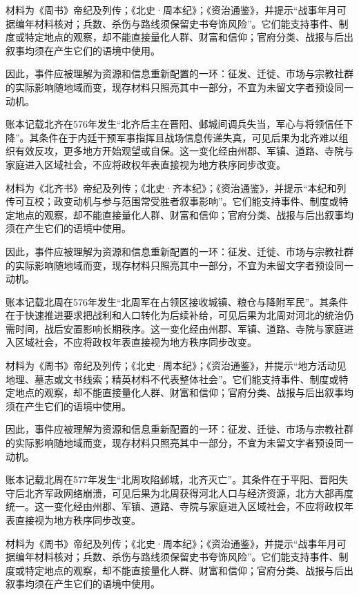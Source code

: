 材料为《周书》帝纪及列传；《北史·周本纪》；《资治通鉴》，并提示“战事年月可据编年材料核对；兵数、杀伤与路线须保留史书夸饰风险”。它们能支持事件、制度或特定地点的观察，却不能直接量化人群、财富和信仰；官府分类、战报与后出叙事均须在产生它们的语境中使用。

因此，事件应被理解为资源和信息重新配置的一环：征发、迁徙、市场与宗教社群的实际影响随地域而变，现存材料只照亮其中一部分，不宜为未留文字者预设同一动机。

账本记载北齐在576年发生“北齐后主在晋阳、邺城间调兵失当，军心与将领信任下降”。其条件在于内廷干预军事指挥且战场信息传递失真，可见后果为北齐难以组织有效反攻，更多地方开始观望或自保。这一变化经由州郡、军镇、道路、寺院与家庭进入区域社会，不应将政权年表直接视为地方秩序同步改变。

材料为《北齐书》帝纪及列传；《北史·齐本纪》；《资治通鉴》，并提示“本纪和列传可互校；政变动机与参与范围常受胜者叙事影响”。它们能支持事件、制度或特定地点的观察，却不能直接量化人群、财富和信仰；官府分类、战报与后出叙事均须在产生它们的语境中使用。

因此，事件应被理解为资源和信息重新配置的一环：征发、迁徙、市场与宗教社群的实际影响随地域而变，现存材料只照亮其中一部分，不宜为未留文字者预设同一动机。

账本记载北周在576年发生“北周军在占领区接收城镇、粮仓与降附军民”。其条件在于快速推进要求把战利和人口转化为后续补给，可见后果为北周对河北的统治仍需时间，战后安置影响长期秩序。这一变化经由州郡、军镇、道路、寺院与家庭进入区域社会，不应将政权年表直接视为地方秩序同步改变。

材料为《周书》帝纪及列传；《北史·周本纪》；《资治通鉴》，并提示“地方活动见地理、墓志或文书线索；精英材料不代表整体社会”。它们能支持事件、制度或特定地点的观察，却不能直接量化人群、财富和信仰；官府分类、战报与后出叙事均须在产生它们的语境中使用。

因此，事件应被理解为资源和信息重新配置的一环：征发、迁徙、市场与宗教社群的实际影响随地域而变，现存材料只照亮其中一部分，不宜为未留文字者预设同一动机。

账本记载北周在577年发生“北周攻陷邺城，北齐灭亡”。其条件在于平阳、晋阳失守后北齐军政网络崩溃，可见后果为北周获得河北人口与经济资源，北方大部再度统一。这一变化经由州郡、军镇、道路、寺院与家庭进入区域社会，不应将政权年表直接视为地方秩序同步改变。

材料为《周书》帝纪及列传；《北史·周本纪》；《资治通鉴》，并提示“战事年月可据编年材料核对；兵数、杀伤与路线须保留史书夸饰风险”。它们能支持事件、制度或特定地点的观察，却不能直接量化人群、财富和信仰；官府分类、战报与后出叙事均须在产生它们的语境中使用。

